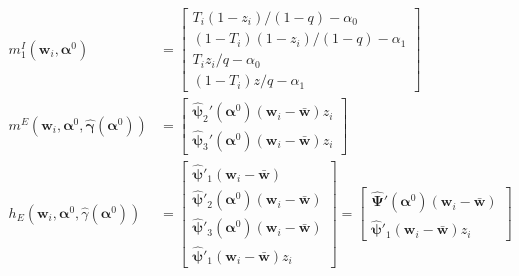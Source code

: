 \documentclass[12pt]{article}
\begin{document}
\begin{align*}
  m_1^I(\mathbf{w}_i, \boldsymbol{\alpha}^0) &=
  \left[
  \begin{array}{r}
  T_i(1 - z_i)/(1 - q) - \alpha_0 \\
  (1 - T_i)(1 - z_i)/(1 - q) - \alpha_1  \\
  T_iz_i/q - \alpha_0 \\
  (1 - T_i)z/q - \alpha_1  
  \end{array}
\right]\\
  m^E\left(\mathbf{w}_i, \boldsymbol{\alpha}^0, \widehat{\boldsymbol{\gamma}}(\boldsymbol{\alpha}^0)\right) &= 
  \left[
  \begin{array}{c}
 \widehat{\boldsymbol{\psi}}_2'(\boldsymbol{\alpha}^0)(\mathbf{w}_i - \bar{\mathbf{w}})z_i \\
   \widehat{\boldsymbol{\psi}}_3'(\boldsymbol{\alpha}^0)(\mathbf{w}_i - \bar{\mathbf{w}})z_i 
  \end{array}
\right]\\
  h_E\left(\mathbf{w}_i, \boldsymbol{\alpha}^0, \widehat{\gamma}(\boldsymbol{\alpha}^0)\right) &= \left[
  \begin{array}{l}
    \widehat{\boldsymbol{\psi}}'_1 (\mathbf{w}_i - \bar{\mathbf{w}})\\ 
    \widehat{\boldsymbol{\psi}}'_2(\boldsymbol{\alpha}^0) (\mathbf{w}_i - \bar{\mathbf{w}})\\ 
    \widehat{\boldsymbol{\psi}}'_3(\boldsymbol{\alpha}^0) (\mathbf{w}_i - \bar{\mathbf{w}})\\
    \widehat{\boldsymbol{\psi}}'_1 (\mathbf{w}_i - \bar{\mathbf{w}})z_i
  \end{array}
\right] = \left[
\begin{array}{l}
  \widehat{\boldsymbol{\Psi}}'(\boldsymbol{\alpha}^0)(\mathbf{w}_i - \bar{\mathbf{w}})\\
    \widehat{\boldsymbol{\psi}}'_1 (\mathbf{w}_i - \bar{\mathbf{w}})z_i
\end{array}
\right]
\end{align*}
\end{document}
